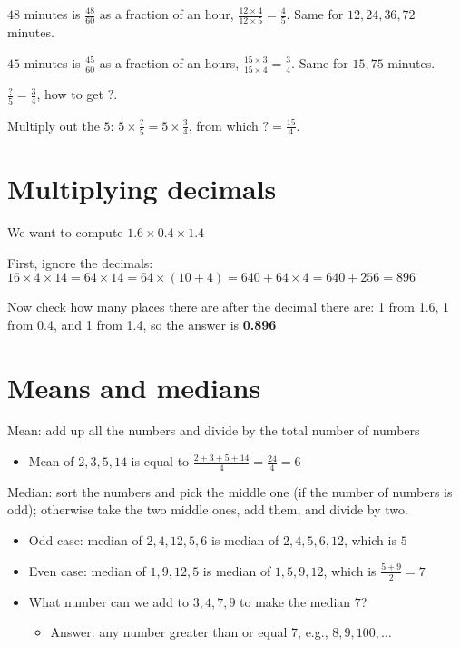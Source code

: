 \documentclass[fullpage,twocolumn]{article}
\begin{document}
$48$ minutes is $\frac{48}{60}$ as a fraction of an hour, $\frac{12\times 4 }{12 \times 5} = \frac{4}{5}$. Same for $12, 24, 36, 72$ minutes.

$45$ minutes is $\frac{45}{60}$ as a fraction of an hours, $\frac{15 \times 3}{15 \times 4} = \frac{3}{4}$. Same for $15, 75$ minutes.


$\frac{?}{5} = \frac{3}{4}$, how to get $?$.

Multiply out the $5$: $5 \times \frac{?}{5} =  5 \times \frac{3}{4}$,
from which $? = \frac{15}{4}$.


\section{Multiplying decimals}

We want to compute $1.6 \times 0.4 \times 1.4$

First, ignore the decimals:
$16 \times 4 \times 14 = 64 \times 14 = 64 \times (10 + 4) = 640 + 64 \times 4 = 640 + 256 = 896$

Now check how many places there are after the decimal there are: 1 from 1.6, 1 from 0.4, and 1 from 1.4,
so the answer is {\bf 0.896}

\section{Means and medians}

Mean: add up all the numbers and divide by the total number of numbers
\begin{itemize}
\item Mean of $2,3,5,14$ is equal to $\frac{2+3+5+14}{4} = \frac{24}{4} = 6$
\end{itemize} 

Median: sort the numbers and pick the middle one (if the number of numbers is odd); 
otherwise take the two middle ones, add them, and divide by two.
\begin{itemize}
\item Odd case: median of $2,4,12,5,6$ is median of $2,4,5,6,12$, which is $5$
\item Even case: median of $1,9,12,5$ is median of $1,5,9,12$, which is $\frac{5+9}{2}=7$
\item What number can we add to $3,4,7,9$ to make the median $7$? 
\begin{itemize}
\item Answer: any number greater than or equal 7, e.g., $8, 9, 100,\ldots$
\end{itemize} 
\end{itemize} 
\end{document}
